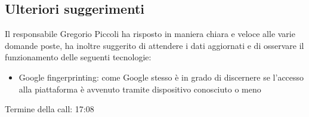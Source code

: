 \subsection{Ulteriori suggerimenti}

Il responsabile Gregorio Piccoli ha risposto in maniera chiara e veloce alle varie domande poste, ha inoltre suggerito di attendere i dati aggiornati e di osservare il funzionamento delle seguenti tecnologie:

\begin{itemize}
		\item Google fingerprinting: come Google stesso è in grado di discernere se l'accesso alla piattaforma è avvenuto tramite dispositivo conosciuto o meno
\end{itemize}


\noindent
Termine della call: 17:08
